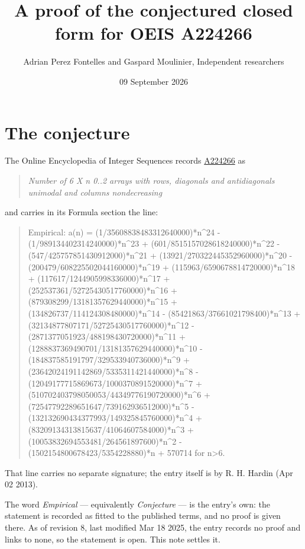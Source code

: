 \documentclass[11pt]{article}
\title{A proof of the conjectured closed form for OEIS A224266}
\author{Adrian Perez Fontelles and Gaspard Moulinier, Independent researchers}
\date{09 September 2026}
\theoremstyle{definition}
\begin{document}
\maketitle
\section{The conjecture}

The Online Encyclopedia of Integer Sequences records \href{https://oeis.org/A224266}{A224266} as

\begin{quote}\itshape Number of 6 X n 0..2 arrays with rows, diagonals and antidiagonals unimodal and columns nondecreasing\end{quote}

and carries in its Formula section the line:

\begin{quote}\ttfamily Empirical: a(n) = (1/35608838483312640000)*n\textasciicircum{}24 - (1/989134402314240000)*n\textasciicircum{}23 + (601/8515157028618240000)*n\textasciicircum{}22 - (547/425757851430912000)*n\textasciicircum{}21 + (13921/270322445352960000)*n\textasciicircum{}20 - (200479/608225502044160000)*n\textasciicircum{}19 + (115963/6590678814720000)*n\textasciicircum{}18 + (117617/1244905998336000)*n\textasciicircum{}17 + (252537361/52725430517760000)*n\textasciicircum{}16 + (879308299/13181357629440000)*n\textasciicircum{}15 + (134826737/114124308480000)*n\textasciicircum{}14 - (85421863/37661021798400)*n\textasciicircum{}13 + (32134877807171/52725430517760000)*n\textasciicircum{}12 - (2871377051923/488198430720000)*n\textasciicircum{}11 + (1288837369490701/13181357629440000)*n\textasciicircum{}10 - (184837585191797/329533940736000)*n\textasciicircum{}9 + (23642024191142869/5335311421440000)*n\textasciicircum{}8 - (12049177715869673/1000370891520000)*n\textasciicircum{}7 + (510702403798050053/44349776190720000)*n\textasciicircum{}6 + (72547792289651647/739162936512000)*n\textasciicircum{}5 - (132132690434377993/149325845760000)*n\textasciicircum{}4 + (83209134313815637/41064607584000)*n\textasciicircum{}3 + (10053832694553481/264561897600)*n\textasciicircum{}2 - (1502154800678423/5354228880)*n + 570714 for n>6.\end{quote}

That line carries no separate signature; the entry itself is by R. H. Hardin (Apr 02 2013).

The word {\itshape Empirical} --- equivalently {\itshape Conjecture} --- is the entry's own: the statement is recorded as fitted to the published terms, and no proof is given there. As of revision 8, last modified Mar 18 2025, the entry records no proof and links to none, so the statement is open. This note settles it.
\end{document}
